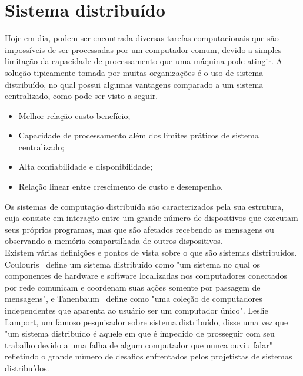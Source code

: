 
	
	\section{Sistema distribuído}
	Hoje em dia, podem ser encontrada diversas tarefas computacionais que são impossíveis de ser processadas por um computador comum, devido a simples limitação da capacidade de processamento que uma máquina pode atingir. A solução tipicamente tomada por muitas organizações é o uso de sistema distribuído, no qual possui algumas vantagens comparado a um sistema centralizado, como pode ser visto a seguir.
	
	\begin{itemize}
		\item Melhor relação custo-benefício;
		\item Capacidade de processamento além dos limites práticos de sistema centralizado;
		\item Alta confiabilidade e disponibilidade;
		\item Relação linear entre crescimento de custo e desempenho.
	\end{itemize}
	Os sistemas de computação distribuída são caracterizados pela sua estrutura, cuja consiste em interação entre um grande número de dispositivos que executam seus próprios programas, mas que são afetados recebendo as mensagens ou observando a memória compartilhada de outros dispositivos.
	\\
	
	Existem várias definições e pontos de vista sobre o que são sistemas distribuídos. Coulouris~\cite{coulouris06} define um sistema distribuído como "um sistema no qual os componentes de hardware e software localizadas nos computadores conectados por rede comunicam e coordenam suas ações somente por passagem de mensagens", e Tanenbaum~\cite{tanenbaum07} define como "uma coleção de computadores independentes que aparenta ao usuário ser um computador único". Leslie Lamport, um famoso pesquisador sobre sistema distribuído, disse uma vez que "um sistema distribuído é aquele em que é impedido de prosseguir com seu trabalho devido a uma falha de algum computador que nunca ouviu falar" refletindo o grande número de desafios enfrentados pelos projetistas de sistemas distribuídos.
	\\
	
